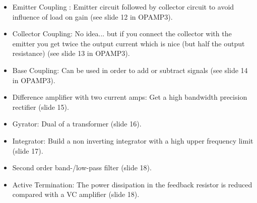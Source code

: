 			\begin{itemize}
				\setlength{\itemsep}{-4pt}
				\item Emitter Coupling : Emitter circuit followed by collector circuit to avoid influence of load on gain (see slide 12 in OPAMP3).
				\item Collector Coupling: No idea... but if you connect the collector with the emitter you get twice the output current which is nice (but half the output resistance) (see slide 13 in OPAMP3).
				\item Base Coupling: Can be used in order to add or subtract signals (see slide 14 in OPAMP3).
				\item Difference amplifier with two current amps: Get a high bandwidth precision rectifier (slide 15).
				\item Gyrator: Dual of a transformer (slide 16).
				\item Integrator: Build a non inverting integrator with a high upper frequency limit (slide 17).
				\item Second order band-/low-pass filter (slide 18).
				\item Active Termination: The power dissipation in the feedback resistor is reduced compared with a VC amplifier (slide 18).
			\end{itemize}

			